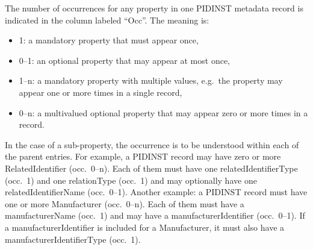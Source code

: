 \documentclass[titlepage=true,twoside=false,DIV=13]{scrartcl}
\begin{document}
The number of occurrences for any property in one PIDINST metadata
record is indicated in the column labeled ``Occ''.  The meaning is:
\begin{itemize}
\item 1: a mandatory property that must appear once,
\item 0--1: an optional property that may appear at most once,
\item 1--n: a mandatory property with multiple values, e.g.\ the
  property may appear one or more times in a single record,
\item 0--n: a multivalued optional property that may appear zero
  or more times in a record.
\end{itemize}
In the case of a sub-property, the occurrence is to be understood
within each of the parent entries.  For example, a PIDINST record may
have zero or more RelatedIdentifier (occ.\ 0--n).  Each of them must
have one relatedIdentifierType (occ.\ 1) and one relationType
(occ.\ 1) and may optionally have one relatedIdentifierName
(occ.\ 0--1).  Another example: a PIDINST record must have one or more
Manufacturer (occ.\ 0--n).  Each of them must have a manufacturerName
(occ.\ 1) and may have a manufacturerIdentifier (occ.\ 0--1).  If a
manufacturerIdentifier is included for a Manufacturer, it must also
have a manufacturerIdentifierType (occ.\ 1).

\newlength{\idcolw}\settowidth{\idcolw}{5.3.1}
\newlength{\propcolw}\settowidth{\propcolw}{instrumentTypeIdentifierType}
\newlength{\occcolw}
\newlength{\valcolw}\settowidth{\valcolw}{Controlled list of values:}
\setlength{\defcolw}{\textwidth}
\addtolength{\defcolw}{-\idcolw}
\addtolength{\defcolw}{-\propcolw}
\addtolength{\defcolw}{-\occcolw}
\addtolength{\defcolw}{-\valcolw}
\addtolength{\defcolw}{-10\tabcolsep}
\end{document}
